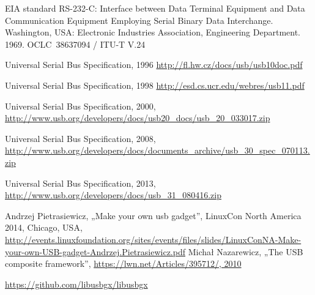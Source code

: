 \documentclass[10pt, a5paper]{article}
\begin{document}
\begin{thebibliography}{99}

 EIA standard RS-232-C: Interface between Data Terminal Equipment and Data Communication Equipment Employing Serial Binary Data Interchange. Washington, USA: Electronic Industries Association, Engineering Department. 1969. OCLC 38637094 / ITU-T V.24

 Universal Serial Bus Specification, 1996 \url{http://fl.hw.cz/docs/usb/usb10doc.pdf}

 Universal Serial Bus Specification, 1998 \url{ http://esd.cs.ucr.edu/webres/usb11.pdf}

 Universal Serial Bus Specification, 2000,\url{ http://www.usb.org/developers/docs/usb20\_docs/usb\_20\_033017.zip}

 Universal Serial Bus Specification, 2008,\url{ http://www.usb.org/developers/docs/documents\_archive/usb\_30\_spec\_070113.zip}

 Universal Serial Bus Specification, 2013,\url{ http://www.usb.org/developers/docs/usb\_31\_080416.zip}

 Andrzej Pietrasiewicz, „Make your own usb gadget”, LinuxCon North America 2014, Chicago, USA,\url{ http://events.linuxfoundation.org/sites/events/files/slides/LinuxConNA-Make-your-own-USB-gadget-Andrzej.Pietrasiewicz.pdf}
 Michał Nazarewicz, „The USB composite framework”, 
\url{https://lwn.net/Articles/395712/, 2010}

 \url{https://github.com/libusbgx/libusbgx}
\end{thebibliography}
\end{document}
